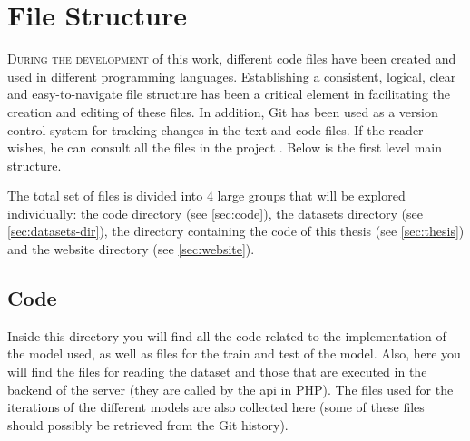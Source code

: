 

\chapter{File Structure}\label{cha:files}



\lettrine{D}{uring the development} of this work, different code files have
been created and used in different programming languages. Establishing a
consistent, logical, clear and easy-to-navigate file structure has been a
critical element in facilitating the creation and editing of these files. In
addition, Git has been used as a version control system for tracking changes in
the text and code files. If the reader wishes, he can consult all the files in
the project
. Below
is the first level main structure.\medskip

\medskip

The total set of files is divided into 4 large groups that will be explored
individually: the code directory (see \vref{sec:code}), the datasets directory
(see \vref{sec:datasets-dir}), the directory containing the code of this thesis
(see \vref{sec:thesis}) and the website directory (see \vref{sec:website}).



\section{Code}\label{sec:code}

Inside this directory you will find all the code related to the implementation
of the model used, as well as files for the train and test of the model. Also,
here you will find the files for reading the dataset and those that are
executed in the backend of the server (they are called by the \gls{api} in
PHP). The files used for the iterations of the different models are also
collected here (some of these files should possibly be retrieved from the Git
history).\medskip




